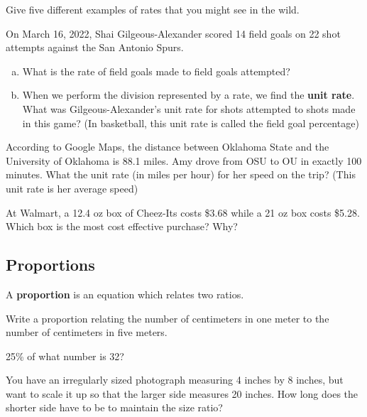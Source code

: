 \documentclass[notes]{subfiles}
\begin{document}
		\begin{ex}
			Give five different examples of rates that you might see in the wild.%
		\end{ex}
			
		\begin{ex}
			On March 16, 2022, Shai Gilgeous-Alexander scored 14 field goals on 22 shot attempts against the San Antonio Spurs.%
			\begin{enumerate}[(a)]
				\item What is the rate of field goals made to field goals attempted?%
					
				\item When we perform the division represented by a rate, we find the \textbf{unit rate}.  What was Gilgeous-Alexander's unit rate for shots attempted to shots made in this game?  (In basketball, this unit rate is called the field goal percentage)%
			\end{enumerate}
		\end{ex}
			\newpage
			
		\begin{ex}
			According to Google Maps, the distance between Oklahoma State and the University of Oklahoma is 88.1 miles.  Amy drove from OSU to OU in exactly 100 minutes.  What the unit rate (in miles per hour) for her speed on the trip? (This unit rate is her average speed)%
		\end{ex}
			\vs{1}
			
		\begin{ex}
			At Walmart, a 12.4 oz box of Cheez-Its costs \$3.68 while a 21 oz box costs \$5.28.  Which box is the most cost effective purchase?  Why?%
		\end{ex}
			\vs{1}
			
	\subsection*{Proportions}
		\begin{defn}[Proportion]
			A \textbf{proportion} is an equation which relates two ratios.%
		\end{defn}
		
		\begin{ex}
			Write a proportion relating the number of centimeters in one meter to the number of centimeters in five meters.%
		\end{ex}
			\vs{1}
			
		\begin{ex}
			25\% of what number is 32?%
		\end{ex}
			\vs{1}
			\newpage
			
		\begin{ex}
			You have an irregularly sized photograph measuring 4 inches by 8 inches, but want to scale it up so that the larger side measures 20 inches.  How long does the shorter side have to be to maintain the size ratio?%
		\end{ex}

\clearpage
\end{document}
